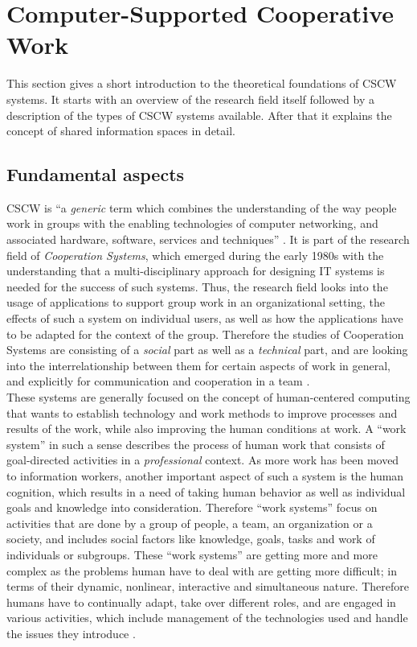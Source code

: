 
\section{Computer-Supported Cooperative Work}
\label{sec:cscw}

This section gives a short introduction to the theoretical foundations of \gls{CSCW} systems. It starts with an overview of the research field itself followed by a description of the types of \gls{CSCW} systems available. After that it explains the concept of shared information spaces in detail.

\subsection{Fundamental aspects}
\label{sec:cscw_definition}

\gls{CSCW} is ``a \emph{generic} term which combines the understanding of the way people work in groups with the enabling technologies of computer networking, and associated hardware, software, services and techniques'' \citep[pg. 92]{borghoff2000computer}. It is part of the research field of \emph{Cooperation Systems}, which emerged during the early 1980s with the understanding that a multi-disciplinary approach for designing \gls{IT} systems is needed for the success of such systems. Thus, the research field looks into the usage of applications to support group work in an organizational setting, the effects of such a system on individual users, as well as how the applications have to be adapted for the context of the group. Therefore the studies of Cooperation Systems are consisting of a \emph{social} part as well as a \emph{technical} part, and are looking into the interrelationship between them for certain aspects of work in general, and explicitly for communication and cooperation in a team \citep{Grudin1994}. \\

These systems are generally focused on the concept of human-centered computing that wants to establish technology and work methods to improve processes and results of the work, while also improving the human conditions at work. A ``work system'' in such a sense describes the process of human work that consists of goal-directed activities in a \emph{professional} context. As more work has been moved to information workers, another important aspect of such a system is the human cognition, which results in a need of taking human behavior as well as individual goals and knowledge into consideration. Therefore ``work systems'' focus on activities that are done by a group of people, a team, an organization or a society, and includes social factors like knowledge, goals, tasks and work of individuals or subgroups. These ``work systems'' are getting more and more complex as the problems human have to deal with are getting more difficult; in terms of their dynamic, nonlinear, interactive and simultaneous nature. Therefore humans have to continually adapt, take over different roles, and are engaged in various activities, which include management of the technologies used and handle the issues they introduce \citep{Hoffmann2009}. \\

